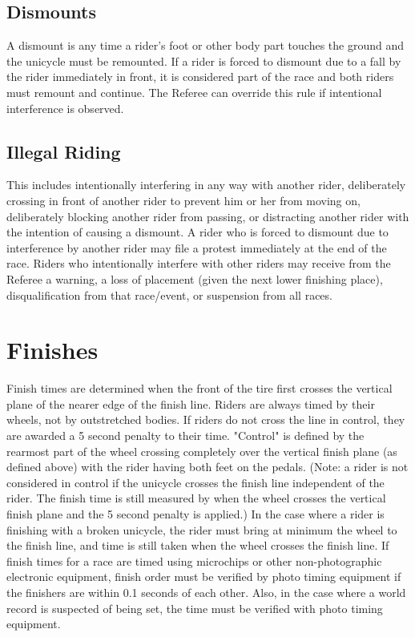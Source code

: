 \subsection{Dismounts}
A dismount is any time a rider’s foot or other body part touches the ground and the unicycle must be remounted. If a rider is forced to dismount due to a fall by the rider immediately in front, it is considered part of the race and both riders must remount and continue. The Referee can override this rule if intentional interference is observed.

\subsection{Illegal Riding}
This includes intentionally interfering in any way with another rider, deliberately crossing in front of another rider to prevent him or her from moving on, deliberately blocking another rider from passing, or distracting another rider with the intention of causing a dismount. A rider who is forced to dismount due to interference by another rider may file a protest immediately at the end of the race. Riders who intentionally interfere with other riders may receive from the Referee a warning, a loss of placement (given the next lower finishing place), disqualification from that race/event, or suspension from all races.

\section{Finishes}
Finish times are determined when the front of the tire first crosses the vertical plane of the nearer edge of the finish line.
Riders are always timed by their wheels, not by outstretched bodies. If riders do not cross the line in control, they are awarded a 5 second penalty to their time. "Control" is defined by the rearmost part of the wheel crossing completely over the vertical finish plane (as defined above) with the rider having both feet on the pedals. (Note: a rider is not considered in control if the unicycle crosses the finish line independent of the rider. The finish time is still measured by when the wheel crosses the vertical finish plane and the 5 second penalty is applied.)
In the case where a rider is finishing with a broken unicycle, the rider must bring at minimum the wheel to the finish line, and time is still taken when the wheel crosses the finish line.
If finish times for a race are timed using microchips or other non-photographic electronic equipment, finish order must be verified by photo timing equipment if the finishers are within 0.1 seconds of each other. Also, in the case where a world record is suspected of being set, the time must be verified with photo timing equipment.

